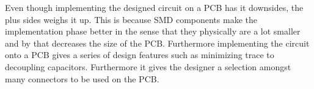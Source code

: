 Even though implementing the designed circuit on a PCB has it downsides, the plus sides weighs it up. This is because SMD components make the implementation phase better in the sense that they physically are a lot smaller and by that decreases the size of the PCB. Furthermore implementing the circuit onto a PCB gives a series of design features such as minimizing trace to decoupling capacitors. Furthermore it gives the designer a selection amongst many connectors to be used on the PCB. 

